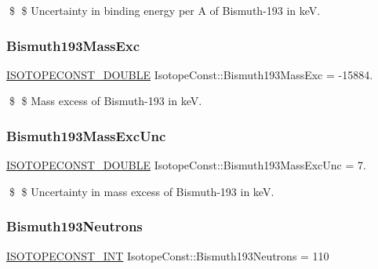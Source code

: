 \$ \$ Uncertainty in binding energy per A of Bismuth-\/193 in keV. \mbox{\label{group___isotope_const-_bismuth-_bi193_ga62f13ad9f71bff47d9fb1cf9ab782855}} 
\subsubsection{\texorpdfstring{Bismuth193\+Mass\+Exc}{Bismuth193MassExc}}
{\footnotesize\ttfamily \mbox{\hyperlink{group___isotope_const-_macros_ga8f45a7272ce02c0b4c65c44636ed719a}{I\+S\+O\+T\+O\+P\+E\+C\+O\+N\+S\+T\+\_\+\+D\+O\+U\+B\+LE}} Isotope\+Const\+::\+Bismuth193\+Mass\+Exc = -\/15884.}

\$ \$ Mass excess of Bismuth-\/193 in keV. \mbox{\label{group___isotope_const-_bismuth-_bi193_gaf2afa744e65cdafc8dfe07fd2b13ab64}} 
\subsubsection{\texorpdfstring{Bismuth193\+Mass\+Exc\+Unc}{Bismuth193MassExcUnc}}
{\footnotesize\ttfamily \mbox{\hyperlink{group___isotope_const-_macros_ga8f45a7272ce02c0b4c65c44636ed719a}{I\+S\+O\+T\+O\+P\+E\+C\+O\+N\+S\+T\+\_\+\+D\+O\+U\+B\+LE}} Isotope\+Const\+::\+Bismuth193\+Mass\+Exc\+Unc = 7.}

\$ \$ Uncertainty in mass excess of Bismuth-\/193 in keV. \mbox{\label{group___isotope_const-_bismuth-_bi193_ga1965e8bb9581d7c8526c3952d6fe4f3f}} 
\subsubsection{\texorpdfstring{Bismuth193\+Neutrons}{Bismuth193Neutrons}}
{\footnotesize\ttfamily \mbox{\hyperlink{group___isotope_const-_macros_ga5f18360b3e99483a35c32d789e62621c}{I\+S\+O\+T\+O\+P\+E\+C\+O\+N\+S\+T\+\_\+\+I\+NT}} Isotope\+Const\+::\+Bismuth193\+Neutrons = 110}

